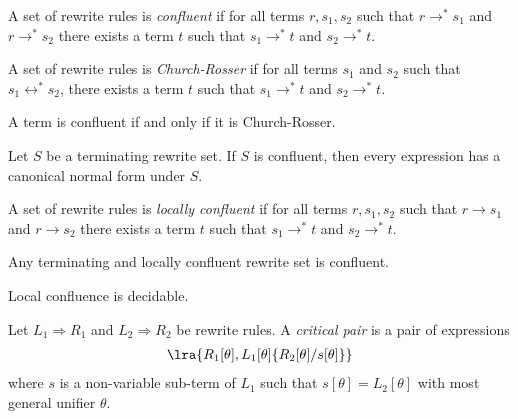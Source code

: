 \documentclass{article}
\begin{document}
\begin{definition}
    A set of rewrite rules is \emph{confluent} if for all terms $r,s_1,s_2$ such that
    $r\to^*s_1$ and $r\to^*s_2$ there exists a term $t$ such that
    $s_1\to^*t$ and $s_2\to^*t$.
\end{definition}

\begin{definition}
    A set of rewrite rules is \emph{Church-Rosser} if for all terms $s_1$ and $s_2$
    such that $s_1\leftrightarrow^* s_2$, there exists a term $t$ such that $s_1\to^*t$
    and $s_2\to^* t$.
\end{definition}

\begin{theorem}
    A term is confluent if and only if it is Church-Rosser.
\end{theorem}

\begin{theorem}
    Let $S$ be a terminating rewrite set. If $S$ is confluent, then every expression has a
    canonical normal form under $S$.
\end{theorem}

\begin{definition}
    A set of rewrite rules is \emph{locally confluent} if for all terms $r,s_1,s_2$ such that
    $r\to s_1$ and $r\to s_2$ there exists a term $t$ such that
    $s_1\to^*t$ and $s_2\to^*t$.
\end{definition}

\begin{lemma}[Newman]
    Any terminating and locally confluent rewrite set is confluent.
\end{lemma}

\begin{theorem}
    Local confluence is decidable.
\end{theorem}

\begin{definition}
    Let $L_1\Rightarrow R_1$ and $L_2\Rightarrow R_2$ be rewrite rules. A \emph{critical pair} is
    a pair of expressions
    \begin{align*}
        \lra{R_1[\theta], L_1[\theta]\{R_2[\theta]/s[\theta]\}}
    \end{align*}
    where $s$ is a non-variable sub-term of $L_1$ such that $s[\theta]=L_2[\theta]$ with
    most general unifier $\theta$.
\end{definition}
\end{document}
